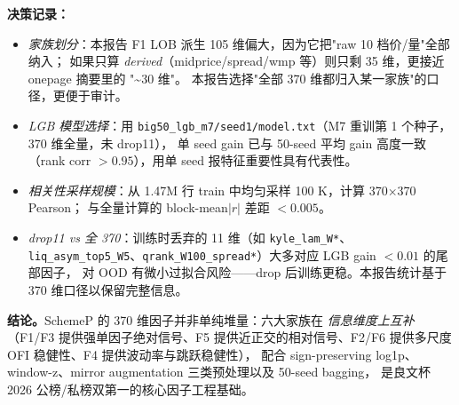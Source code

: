 \documentclass[10.5pt,a4paper]{article}
\begin{document}
\textbf{决策记录：}
\begin{itemize}[leftmargin=2em,itemsep=2pt,topsep=2pt]
  \item \emph{家族划分}：本报告 F1 LOB 派生 105 维偏大，因为它把"raw 10 档价/量"全部纳入；
        如果只算 \emph{derived}（midprice/spread/wmp 等）则只剩 35 维，更接近 onepage 摘要里的 "\textasciitilde 30 维"。
        本报告选择"全部 370 维都归入某一家族"的口径，更便于审计。
  \item \emph{LGB 模型选择}：用 \texttt{big50\_lgb\_m7/seed1/model.txt}（M7 重训第 1 个种子，370 维全量，未 drop11），
        单 seed gain 已与 50-seed 平均 gain 高度一致（rank corr $>0.95$），用单 seed 报特征重要性具有代表性。
  \item \emph{相关性采样规模}：从 1.47M 行 train 中均匀采样 100 K，计算 370$\times$370 Pearson；
        与全量计算的 block-mean$|r|$ 差距 $<0.005$。
  \item \emph{drop11 vs 全 370}：训练时丢弃的 11 维（如 \texttt{kyle\_lam\_W*}、\texttt{liq\_asym\_top5\_W5}、\texttt{qrank\_W100\_spread*}）大多对应 LGB gain $<0.01$ 的尾部因子，
        对 OOD 有微小过拟合风险——drop 后训练更稳。本报告统计基于 370 维口径以保留完整信息。
\end{itemize}

\textbf{结论。}SchemeP 的 370 维因子并非单纯堆量：六大家族在 \emph{信息维度上互补}（F1/F3 提供强单因子绝对信号、F5 提供近正交的相对信号、F2/F6 提供多尺度 OFI 稳健性、F4 提供波动率与跳跃稳健性），
配合 sign-preserving log1p、window-z、mirror augmentation 三类预处理以及 50-seed bagging，
是良文杯 2026 公榜/私榜双第一的核心因子工程基础。
\end{document}
